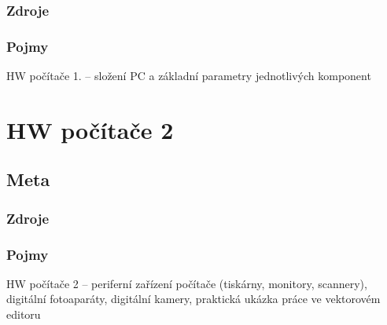 \documentclass[12pt]{article}
\begin{document}
\subsubsection{Zdroje}
\subsubsection{Pojmy}
HW počítače 1. – složení PC a základní parametry jednotlivých komponent

\section{HW počítače 2}
\subsection{Meta}
\subsubsection{Zdroje}
\subsubsection{Pojmy}
HW počítače 2 – periferní zařízení počítače (tiskárny, monitory, scannery), digitální fotoaparáty, digitální kamery, praktická ukázka práce ve vektorovém editoru
\end{document}
